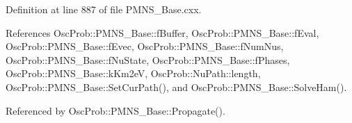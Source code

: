 Definition at line 887 of file P\+M\+N\+S\+\_\+\+Base.\+cxx.



References Osc\+Prob\+::\+P\+M\+N\+S\+\_\+\+Base\+::f\+Buffer, Osc\+Prob\+::\+P\+M\+N\+S\+\_\+\+Base\+::f\+Eval, Osc\+Prob\+::\+P\+M\+N\+S\+\_\+\+Base\+::f\+Evec, Osc\+Prob\+::\+P\+M\+N\+S\+\_\+\+Base\+::f\+Num\+Nus, Osc\+Prob\+::\+P\+M\+N\+S\+\_\+\+Base\+::f\+Nu\+State, Osc\+Prob\+::\+P\+M\+N\+S\+\_\+\+Base\+::f\+Phases, Osc\+Prob\+::\+P\+M\+N\+S\+\_\+\+Base\+::k\+Km2eV, Osc\+Prob\+::\+Nu\+Path\+::length, Osc\+Prob\+::\+P\+M\+N\+S\+\_\+\+Base\+::\+Set\+Cur\+Path(), and Osc\+Prob\+::\+P\+M\+N\+S\+\_\+\+Base\+::\+Solve\+Ham().



Referenced by Osc\+Prob\+::\+P\+M\+N\+S\+\_\+\+Base\+::\+Propagate().


